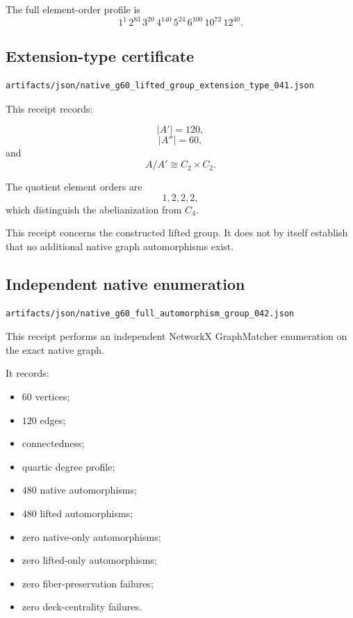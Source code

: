 The full element-order profile is
\[
1^1\,2^{83}\,3^{20}\,4^{140}\,5^{24}\,6^{100}\,
10^{72}\,12^{40}.
\]

\subsection{Extension-type certificate}

\begin{verbatim}
artifacts/json/native_g60_lifted_group_extension_type_041.json
\end{verbatim}

This receipt records:

\[
|A'|=120,
\]
\[
|A''|=60,
\]
and
\[
A/A'\cong C_2\times C_2.
\]

The quotient element orders are
\[
1,2,2,2,
\]
which distinguish the abelianization from $C_4$.

This receipt concerns the constructed lifted group. It does not by
itself establish that no additional native graph automorphisms exist.

\subsection{Independent native enumeration}

\begin{verbatim}
artifacts/json/native_g60_full_automorphism_group_042.json
\end{verbatim}

This receipt performs an independent NetworkX GraphMatcher enumeration
on the exact native graph.

It records:

\begin{itemize}
\item $60$ vertices;
\item $120$ edges;
\item connectedness;
\item quartic degree profile;
\item $480$ native automorphisms;
\item $480$ lifted automorphisms;
\item zero native-only automorphisms;
\item zero lifted-only automorphisms;
\item zero fiber-preservation failures;
\item zero deck-centrality failures.
\end{itemize}

